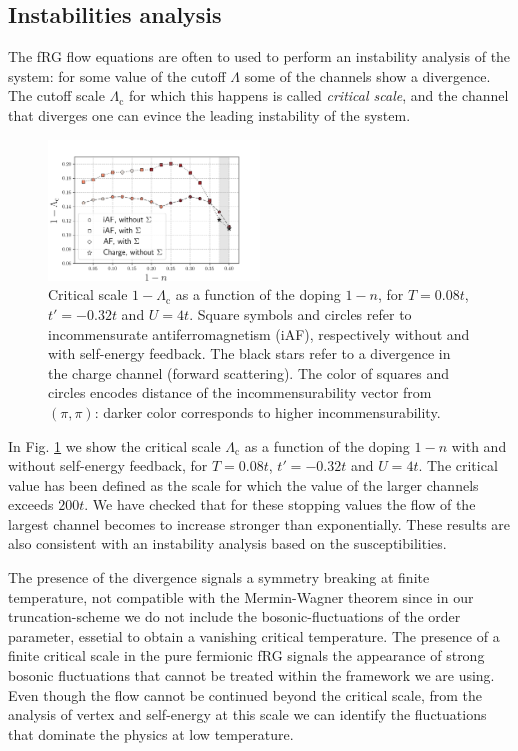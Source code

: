 \subsection{Instabilities analysis}
The fRG flow equations are often to used to perform an instability analysis of the system: 
for some value of the cutoff $\Lambda$ some of the channels show a divergence. 
The cutoff scale $\Lambda_{\mathrm{c}} $ for which this happens is called \textit{critical scale}, and the channel that diverges one can evince the leading instability of the system. 
\begin{figure}
\includegraphics[width=0.5\textwidth]{images/criscale.png}
\caption{Critical scale $1-\Lambda_{\mathrm{c}}$ as a function of the doping $1-n$, for $T = 0.08t$, $t'=-0.32t$ and $U=4t$. 
Square symbols and circles refer to incommensurate antiferromagnetism (iAF), respectively without and with self-energy feedback.
The black stars refer to a divergence in the charge channel (forward scattering). 
The color of squares and circles encodes distance of the incommensurability vector from $(\pi,\pi)$: darker color corresponds to higher incommensurability. }  
\label{fig:criscale} 
\end{figure}
In Fig. \ref{fig:criscale} we show the critical scale $\Lambda_{\mathrm{c}}$ as a function of the doping $1-n$ with and without self-energy feedback,  for $T=0.08t$, $t'=-0.32t$ and  $U=4t$.
The critical value has been defined as the scale for which the value of  the larger channels exceeds $200t$. 
We have checked that for these stopping values the flow of the largest channel becomes to increase stronger than exponentially. These results are also consistent with an instability analysis based on the susceptibilities.        

The presence of the divergence signals a symmetry breaking at finite temperature, not compatible with the Mermin-Wagner theorem\cite{Mermin1966} since in our truncation-scheme we do not include the bosonic-fluctuations of the order parameter\cite{Baier2004}, essetial to obtain a vanishing critical temperature. 
The presence of a finite critical scale in the pure fermionic fRG signals the appearance of strong bosonic fluctuations that cannot be treated within the framework we are using. 
Even though the flow cannot be continued beyond the critical scale, from the analysis of vertex and self-energy at this scale we can identify the fluctuations that dominate the physics at low temperature.

